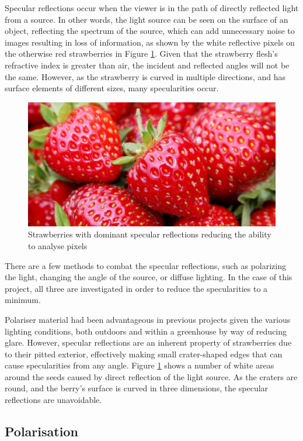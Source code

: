 \documentclass[fleqn,twoside,12pt]{report}
\begin{document}
Specular reflections occur when the viewer is in the path of directly reflected light from a source. In other words, the light source can be seen on the surface of an object, reflecting the spectrum of the source, which can add unnecessary noise to images resulting in loss of information, as shown by the white reflective pixels on the otherwise red strawberries in Figure \ref{fig:strawberry_glare}\cite{gurney}. Given that the strawberry flesh's refractive index is greater than air, the incident and reflected angles will not be the same. However, as the strawberry is curved in multiple directions, and has surface elements of different sizes, many specularities occur. 

\begin{figure}[h]
	\centering
	\includegraphics[width=.6\linewidth]{strawberry_glare.jpg}
	\caption{Strawberries with dominant specular reflections reducing the ability to analyse pixels}
	\label{fig:strawberry_glare}
\end{figure}%

There are a few methods to combat the specular reflections, such as polarizing the light, changing the angle of the source, or diffuse lighting. In the case of this project, all three are investigated in order to reduce the specularities to a minimum. 

Polariser material had been advantageous in previous projects given the various lighting conditions, both outdoors and within a greenhouse by way of reducing glare. However, specular reflections are an inherent property of strawberries due to their pitted exterior, effectively making small crater-shaped edges that can cause specularities from any angle. Figure \ref{fig:strawberry_glare} shows a number of white areas around the seeds caused by direct reflection of the light source. As the craters are round, and the berry's surface is curved in three dimensions, the specular reflections are unavoidable.


\subsection{Polarisation}
\end{document}
